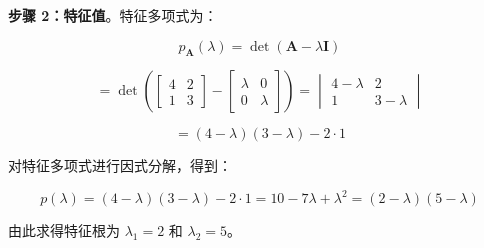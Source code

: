 \begin{notebox}
\textbf{步骤 2：特征值}。特征多项式为：

\begin{equation}
p_{\boldsymbol{A}}(\lambda) = \det(\boldsymbol{A} - \lambda \boldsymbol{I})
\tag{4.29a}\label{eq:4-29a}
\end{equation}

\begin{equation}
= \det\left(\begin{bmatrix} 4 & 2 \\ 1 & 3 \end{bmatrix} - \begin{bmatrix} \lambda & 0 \\ 0 & \lambda \end{bmatrix}\right) = \begin{vmatrix} 4 - \lambda & 2 \\ 1 & 3 - \lambda \end{vmatrix}
\tag{4.29b}\label{eq:4-29b}
\end{equation}

\begin{equation}
= (4 - \lambda)(3 - \lambda) - 2 \cdot 1
\tag{4.29c}\label{eq:4-29c}
\end{equation}

对特征多项式进行因式分解，得到：

\begin{equation}
p(\lambda) = (4 - \lambda)(3 - \lambda) - 2 \cdot 1 = 10 - 7\lambda + \lambda^2 = (2 - \lambda)(5 - \lambda)
\tag{4.30}\label{eq:4-30}
\end{equation}

由此求得特征根为 $ \lambda_1 = 2 $ 和 $ \lambda_2 = 5 $。
\end{notebox}

